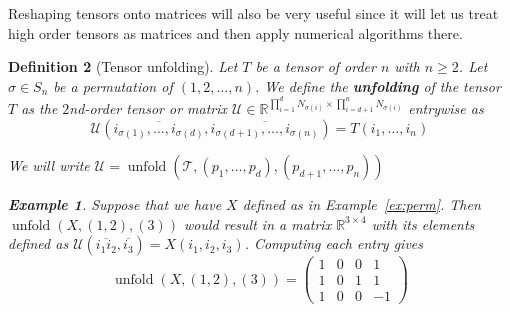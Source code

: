 \documentclass[11pt,a4paper,openright,oneside]{book}
\numberwithin{equation}{section}
\newtheorem{defn0}{Definition}[chapter]
\newtheorem{example0}[defn0]{Example}
\newenvironment{definition}{ \begin{defn0}}{\end{defn0}}
\newenvironment{example}{ \begin{example0}\rm}{\end{example0}}
\newcommand{\exref}[1]{Example~\ref{#1}}
\DeclareMathOperator{\unfolding}{unfold}
\begin{document}
Reshaping tensors onto matrices will also be very useful since it will let us treat high order tensors as matrices and then apply numerical algorithms
there.

\begin{definition}[Tensor unfolding]
Let $T$ be a tensor of order $n$ with $n \geqslant 2$. Let $\sigma \in S_n$ be a permutation of $(1,2,\dots, n)$. We define the
\textbf{unfolding} of the tensor $T$ as the $2$nd-order tensor or matrix 
$\mathcal{U} \in \mathbb{R}^{\prod_{i=1}^d N_{\sigma(i)} \times \prod_{i=d+1}^n N_{\sigma(i)}}$ entrywise as
$$ \mathcal{U} (\overline{i_{\sigma(1)}, \dots, i_{\sigma(d)}}, \overline{i_{\sigma(d+1)}, \dots, i_{\sigma(n)}}) = T(i_1, \dots, i_n)$$

We will write $\mathcal{U} = \unfolding{(\mathcal{T}, (p_1, \dots, p_d), (p_{d+1}, \dots, p_n))}$ 

\begin{example}
    Suppose that we have $X$ defined as in \exref{ex:perm}.
        Then $\unfolding{(X, (1, 2), (3))}$ would result in a matrix $\mathbb{R}^{3 \times 4}$ with its elements defined as 
        $\mathcal{U}(\overline{i_1  i_2}, \overline{i_3}) = X(i_1, i_2, i_3)$. Computing each entry gives
        $$\unfolding{(X, (1, 2), (3))} = \begin{pmatrix}
            1 & 0 & 0 & 1 \\
            1 & 0 & 1 & 1 \\
            1 & 0 & 0 & -1
        \end{pmatrix}
        $$
    \label{exa:unfold}
\end{example}


\end{definition}
\end{document}
